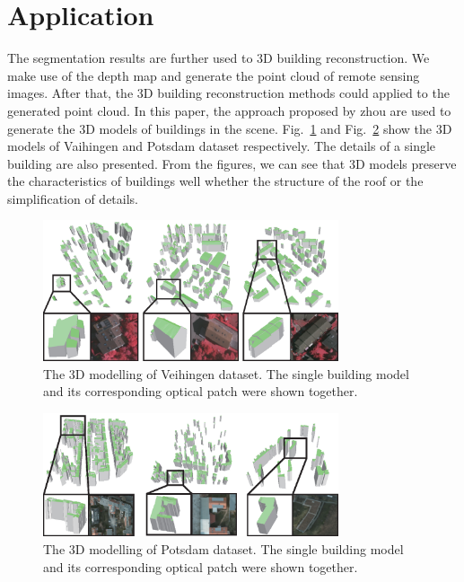 \section{Application}
\label{sec:app}
 The segmentation results are further used to 3D building reconstruction. We make use of the depth map and generate the point cloud of remote sensing images. After that, the 3D building reconstruction methods could applied to the generated point cloud. In this paper, the approach proposed by zhou\cite{IEEEexample:zhou20112} are used to generate the 3D models of buildings in the scene. 
Fig.~\ref{fig:Vaihingen-3Dmodeling}
and Fig.~\ref{fig:Potsdam-3Dmodeling} show the 3D models of Vaihingen and Potsdam dataset respectively. The details of a single building are also presented. From the figures, we can see that 3D models preserve the characteristics of buildings well whether the structure of the roof or the simplification of details.
\begin{figure}
\vspace{-0.4cm}
\setlength{\abovecaptionskip}{-0cm}
\setlength{\belowcaptionskip}{-2cm} 
\centering
\includegraphics[width=8.7cm]{Figures/Vaihigen_3Dmodelling.eps}
\caption{The 3D modelling of Veihingen dataset. The single building model and its corresponding optical patch were shown together.}
\label{fig:Vaihingen-3Dmodeling}
\end{figure}

\begin{figure}
\setlength{\abovecaptionskip}{-0cm}
\setlength{\belowcaptionskip}{-2cm} 
\centering
\includegraphics[width=8.7cm]{Figures/potsdam_models.eps}
\caption{The 3D modelling of Potsdam dataset. The single building model and its corresponding optical patch were shown together.}
\label{fig:Potsdam-3Dmodeling}
\end{figure}
